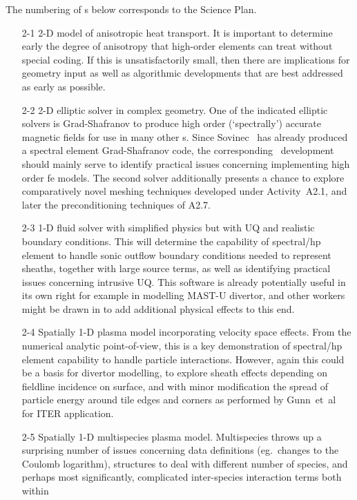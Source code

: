 The numbering of \papp s below corresponds to the Science Plan.
\begin{itemize}
\item[2-1] 2-D model of anisotropic heat transport. It is important to determine early the
degree of anisotropy that high-order elements can treat without special coding. If this 
is unsatisfactorily small, then there are implications for geometry input as well as
algorithmic developments that are best addressed as early as possible.
\item[2-2] 2-D elliptic solver in complex geometry. One of the indicated elliptic solvers is
Grad-Shafranov to produce high order (`spectrally') accurate magnetic fields for
use in many other \papp s. Since Sovinec~\cite{Ho14Solv} has already produced a spectral element
Grad-Shafranov code, the corresponding \nep\ development should mainly serve to
identify practical issues concerning implementing high order fe models. The second
solver additionally presents a chance to explore comparatively novel meshing techniques developed under
Activity~A2.1, and later the preconditioning techniques of A2.7.
\item[2-3] 1-D fluid solver with simplified physics but with UQ and realistic boundary conditions.
This will determine the capability of spectral/hp element to handle sonic outflow
boundary conditions needed to represent sheaths, together with large source terms, as well
as identifying practical issues concerning intrusive UQ. This software is already
potentially useful in its own right for example in modelling MAST-U divertor,
and other workers might be drawn in to add additional physical effects to this end.
\item[2-4] Spatially 1-D plasma model incorporating velocity space effects. From the
numerical analytic point-of-view, this is a key demonstration of spectral/hp element capability to
handle particle interactions. %
However, again this could be a basis for divertor modelling,
to explore sheath effects depending on fieldline incidence on surface, and with minor
modification the spread of particle energy around tile edges and corners as performed
by Gunn~et~al~\cite{Gu19Stud,De19Phys} for ITER application.
\item[2-5] Spatially 1-D multispecies plasma model. Multispecies
throws up a surprising
number of issues concerning data definitions (eg.\ changes to the Coulomb
logarithm), structures to deal with different number of species, and perhaps most
significantly, complicated inter-species interaction terms both within

\end{itemize}

